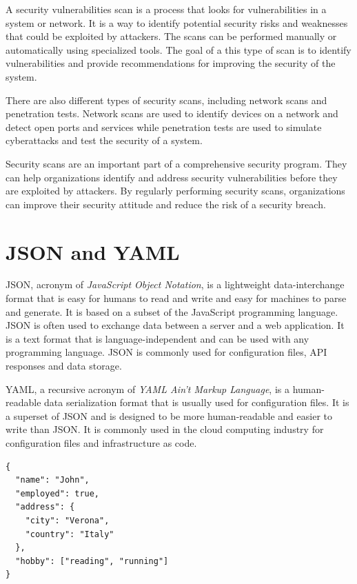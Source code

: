 A security vulnerabilities scan is a process that looks for vulnerabilities in a system or network. It is a way to identify potential security risks and weaknesses that could be exploited by attackers. The scans can be performed manually or automatically using specialized tools. The goal of a this type of scan is to identify vulnerabilities and provide recommendations for improving the security of the system.

There are also different types of security scans, including network scans and penetration tests. Network scans are used to identify devices on a network and detect open ports and services while penetration tests are used to simulate cyberattacks and test the security of a system.

Security scans are an important part of a comprehensive security program. They can help organizations identify and address security vulnerabilities before they are exploited by attackers. By regularly performing security scans, organizations can improve their security attitude and reduce the risk of a security breach.

\section{JSON and YAML}

JSON, acronym of \textit{JavaScript Object Notation}, is a lightweight data-interchange format that is easy for humans to read and write and easy for machines to parse and generate. It is based on a subset of the JavaScript programming language. JSON is often used to exchange data between a server and a web application. It is a text format that is language-independent and can be used with any programming language. JSON is commonly used for configuration files, API responses and data storage.

YAML, a recursive acronym of \textit{YAML Ain't Markup Language}, is a human-readable data serialization format that is usually used for configuration files. It is a superset of JSON and is designed to be more human-readable and easier to write than JSON. It is commonly used in the cloud computing industry for configuration files and infrastructure as code.

\begin{minipage}{\linewidth}
  \begin{lstlisting}[style=json, caption={JSON example}, label={lst:json-example}]
{
  "name": "John",
  "employed": true,
  "address": {
    "city": "Verona",
    "country": "Italy"
  },
  "hobby": ["reading", "running"]
}
  \end{lstlisting}
\end{minipage}

